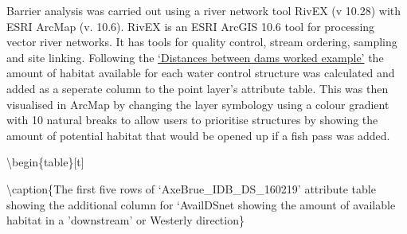 \documentclass[]{article}
\begin{document}
Barrier analysis was carried out using a river network tool RivEX (v
10.28) with ESRI ArcMap (v. 10.6). RivEX is an ESRI ArcGIS 10.6 tool for
processing vector river networks. It has tools for quality control,
stream ordering, sampling and site linking. Following the
\href{http://www.rivex.co.uk/Online-Manual/Distancesbetweendamsaworkedexamp.html}{`Distances
between dams worked example'} the amount of habitat available for each
water control structure was calculated and added as a seperate column to
the point layer's attribute table. This was then visualised in ArcMap by
changing the layer symbology using a colour gradient with 10 natural
breaks to allow users to prioritise structures by showing the amount of
potential habitat that would be opened up if a fish pass was added.

\textbackslash{}begin\{table\}{[}t{]}

\textbackslash{}caption\{\label{tab:unnamed-chunk-5}The first five rows
of `AxeBrue\_IDB\_DS\_160219' attribute table showing the additional
column for `AvailDSnet showing the amount of available habitat in a
'downstream' or Westerly direction\} \centering
\end{document}
